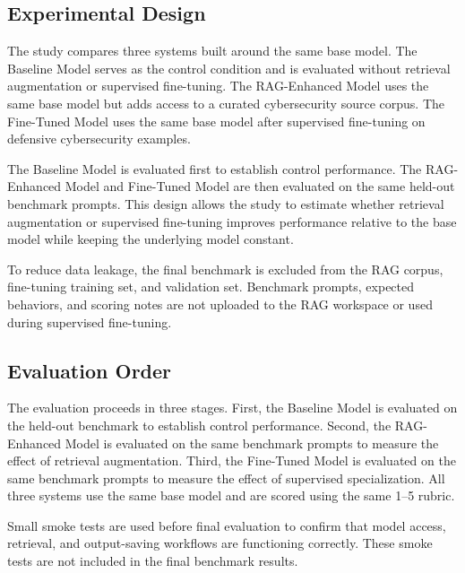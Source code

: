 \subsection{Experimental Design}

The study compares three systems built around the same base model. The Baseline Model serves as the control condition and is evaluated without retrieval augmentation or supervised fine-tuning. The RAG-Enhanced Model uses the same base model but adds access to a curated cybersecurity source corpus. The Fine-Tuned Model uses the same base model after supervised fine-tuning on defensive cybersecurity examples.

The Baseline Model is evaluated first to establish control performance. The RAG-Enhanced Model and Fine-Tuned Model are then evaluated on the same held-out benchmark prompts. This design allows the study to estimate whether retrieval augmentation or supervised fine-tuning improves performance relative to the base model while keeping the underlying model constant.

To reduce data leakage, the final benchmark is excluded from the RAG corpus, fine-tuning training set, and validation set. Benchmark prompts, expected behaviors, and scoring notes are not uploaded to the RAG workspace or used during supervised fine-tuning.

\subsection{Evaluation Order}

The evaluation proceeds in three stages. First, the Baseline Model is evaluated on the held-out benchmark to establish control performance. Second, the RAG-Enhanced Model is evaluated on the same benchmark prompts to measure the effect of retrieval augmentation. Third, the Fine-Tuned Model is evaluated on the same benchmark prompts to measure the effect of supervised specialization. All three systems use the same base model and are scored using the same 1--5 rubric.

Small smoke tests are used before final evaluation to confirm that model access, retrieval, and output-saving workflows are functioning correctly. These smoke tests are not included in the final benchmark results.
